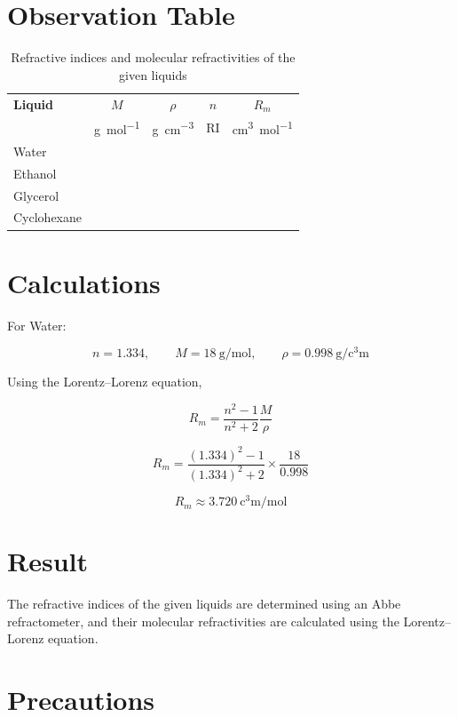 \documentclass[12pt,a4paper]{article}
\begin{document}
\section*{Observation Table}

\begin{table}[htbp]
\centering
\caption{Refractive indices and molecular refractivities of the given liquids}
\renewcommand{\arraystretch}{1.3}
\begin{tabular}{>{\raggedright\arraybackslash}p{2.5cm}
                c c c c}
\toprule
\textbf{Liquid} &
\textbf{$M$} &
\textbf{$\rho$} &
\textbf{$n$} &
\textbf{$R_m$} \\
& \si{\gram\per\mole} &
\si{\gram\per\cubic\centi\metre} &
\si{RI} &
\si{\cubic\centi\metre\per\mole} \\
\midrule
Water       &  &  &  &  \\
Ethanol    &   &  &  &  \\
Glycerol &  &  &  &  \\
Cyclohexane &   &  &  &   \\
\bottomrule
\end{tabular}
\end{table}

\noindent

\section*{Calculations}

For Water:

\[
n = 1.334,\qquad
M = \SI{18}{\gram\per\mole},\qquad
\rho = \SI{0.998}{\gram\per\cubic\centi\metre}
\]

Using the Lorentz--Lorenz equation,

\[
R_m =
\frac{n^2-1}{n^2+2}\frac{M}{\rho}
\]

\[
R_m =
\frac{(1.334)^2-1}{(1.334)^2+2}
\times
\frac{18}{0.998}
\]

\[
\boxed{
R_m \approx \SI{3.720}{\cubic\centi\metre\per\mole}
}
\]

\section*{Result}

The refractive indices of the given liquids are determined using an Abbe refractometer, and their molecular refractivities are calculated using the Lorentz--Lorenz equation.

\section*{Precautions}
\end{document}
